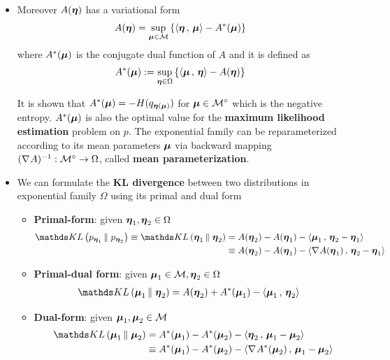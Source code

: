 \documentclass[11pt]{article}
\begin{document}
\begin{itemize}
\item Moreover $A(\boldsymbol{\eta})$ has a variational form 
\begin{align}
A(\boldsymbol{\eta}) &=  \sup_{\boldsymbol{\mu} \in {\mathcal M}}\left\{ \left\langle \boldsymbol{\eta}\,,\, \boldsymbol{\mu} \right\rangle - A^{*}(\boldsymbol{\mu})\right\} \label{eqn: log_partition_variational_form}
\end{align}
where $A^{*}(\boldsymbol{\mu})$ is the conjugate dual function of $A$ and it is defined as
\begin{align}
A^{*}(\boldsymbol{\mu}) &:= \sup_{\boldsymbol{\eta} \in \Omega} \left\{\left\langle \boldsymbol{\mu}\,,\, \boldsymbol{\eta} \right\rangle - A(\boldsymbol{\eta})\right\} \label{eqn: conjugate_dual_partition}
\end{align}

It is shown that $A^{*}(\boldsymbol{\mu})  = -H(q_{\boldsymbol{\eta}(\boldsymbol{\mu})})$ for $\boldsymbol{\mu} \in  {\mathcal M}^{\circ}$ which is the negative entropy. $A^{*}(\boldsymbol{\mu})$ is also the optimal value for the \textbf{maximum likelihood estimation} problem on $p$. The exponential family can be reparameterized according to its mean parameters $\boldsymbol{\mu}$ via backward mapping $(\nabla_{}{A})^{-1}: {\mathcal M}^{\circ} \rightarrow  \Omega$, called \textbf{mean parameterization}.

\item We can formulate the \textbf{KL divergence} between two distributions in exponential family $\Omega$ using its primal and dual form
\begin{itemize}
\item \textbf{Primal-form}: given $\boldsymbol{\eta}_1, \boldsymbol{\eta}_2 \in \Omega$
\begin{align}
\kl{p_{\mb{\eta}_1}}{p_{\mb{\eta}_2}} \equiv  \kl{\mb{\eta}_1}{\mb{\eta}_2}
&=  A(\mb{\eta}_2) - A(\mb{\eta}_1) -  \inn{\mb{\mu}_{1}}{\mb{\eta}_2 - \mb{\eta}_1}  \label{eqn: kl_primal}\\
&\equiv  A(\mb{\eta}_2) - A(\mb{\eta}_1) -  \inn{\grad{}{A}(\mb{\eta}_1)}{\mb{\eta}_2 - \mb{\eta}_1}  \nonumber
\end{align}

\item \textbf{Primal-dual form}: given $\boldsymbol{\mu}_1 \in {\mathcal M}, \boldsymbol{\eta}_2 \in \Omega$
\begin{align}
 \kl{\mb{\mu}_1}{\mb{\eta}_2} &= A(\mb{\eta}_2) + A^{*}(\mb{\mu}_1) - \inn{\mb{\mu}_{1}}{\mb{\eta}_2}  \label{eqn: kl_primal_dual}
\end{align}

\item \textbf{Dual-form}: given $\boldsymbol{\mu}_1, \boldsymbol{\mu}_2  \in {\mathcal M}$
\begin{align}
 \kl{\mb{\mu}_1}{\mb{\mu}_2} &= A^{*}(\mb{\mu}_1) - A^{*}(\mb{\mu}_{2}) - \inn{\mb{\eta}_2}{\mb{\mu}_{1} - \mb{\mu}_{2}}  \label{eqn: kl_dual} \\
 &\equiv  A^{*}(\mb{\mu}_1) - A^{*}(\mb{\mu}_{2}) - \inn{\grad{}{A^{*}}(\mb{\mu}_{2})}{\mb{\mu}_{1} - \mb{\mu}_{2}} \nonumber
\end{align}
\end{itemize}


\end{itemize}
\end{document}

